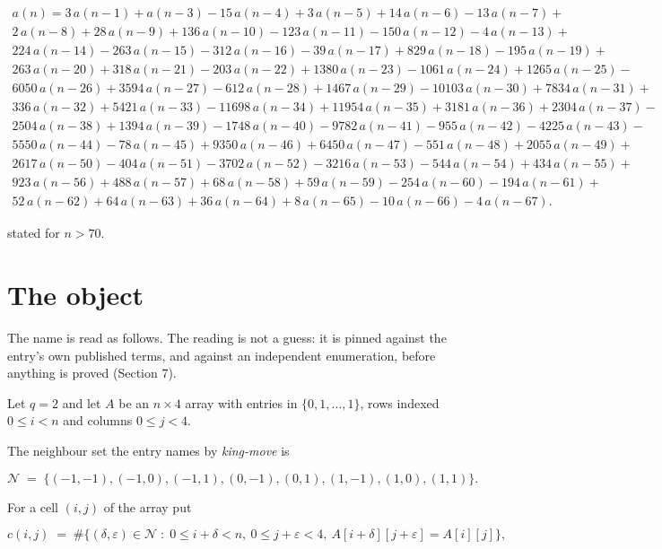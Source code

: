 \documentclass[11pt]{article}
\theoremstyle{definition}
\begin{document}
\begin{multline*} a(n) = 3\,a(n-1) + a(n-3) - 15\,a(n-4) + 3\,a(n-5) + 14\,a(n-6) - 13\,a(n-7) + \\ 2\,a(n-8) + 28\,a(n-9) + 136\,a(n-10) - 123\,a(n-11) - 150\,a(n-12) - 4\,a(n-13) + \\ 224\,a(n-14) - 263\,a(n-15) - 312\,a(n-16) - 39\,a(n-17) + 829\,a(n-18) - 195\,a(n-19) + \\ 263\,a(n-20) + 318\,a(n-21) - 203\,a(n-22) + 1380\,a(n-23) - 1061\,a(n-24) + 1265\,a(n-25) - \\ 6050\,a(n-26) + 3594\,a(n-27) - 612\,a(n-28) + 1467\,a(n-29) - 10103\,a(n-30) + 7834\,a(n-31) + \\ 336\,a(n-32) + 5421\,a(n-33) - 11698\,a(n-34) + 11954\,a(n-35) + 3181\,a(n-36) + 2304\,a(n-37) - \\ 2504\,a(n-38) + 1394\,a(n-39) - 1748\,a(n-40) - 9782\,a(n-41) - 955\,a(n-42) - 4225\,a(n-43) - \\ 5550\,a(n-44) - 78\,a(n-45) + 9350\,a(n-46) + 6450\,a(n-47) - 551\,a(n-48) + 2055\,a(n-49) + \\ 2617\,a(n-50) - 404\,a(n-51) - 3702\,a(n-52) - 3216\,a(n-53) - 544\,a(n-54) + 434\,a(n-55) + \\ 923\,a(n-56) + 488\,a(n-57) + 68\,a(n-58) + 59\,a(n-59) - 254\,a(n-60) - 194\,a(n-61) + \\ 52\,a(n-62) + 64\,a(n-63) + 36\,a(n-64) + 8\,a(n-65) - 10\,a(n-66) - 4\,a(n-67). \end{multline*}

stated for $n > 70$.

\section{The object}

The name is read as follows. The reading is not a guess: it is pinned against the entry's own published terms, and against an independent enumeration, before anything is proved (Section 7).

Let $q = 2$ and let $A$ be an $n \times 4$ array with entries in $\{0,1,\dots,1\}$, rows indexed $0 \le i < n$ and columns $0 \le j < 4$.

The neighbour set the entry names by {\itshape king-move} is

\[\mathcal{N} \;=\; \{(-1,-1), (-1,0), (-1,1), (0,-1), (0,1), (1,-1), (1,0), (1,1)\}.\]

For a cell $(i,j)$ of the array put

\[c(i,j) \;=\; \#\bigl\{(\delta,\varepsilon)\in\mathcal{N} \;:\; 0\le i+\delta<n,\ 0\le j+\varepsilon<4,\ A[i+\delta][j+\varepsilon] = A[i][j]\bigr\},\]
\end{document}
